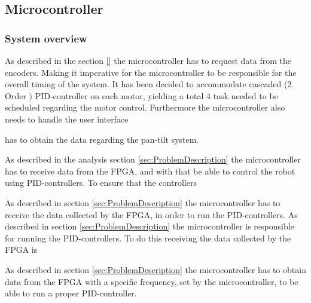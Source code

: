 \documentclass[../../main.tex]{subfiles}
\begin{document}
    



\subsection{Microcontroller} \label{subsec:SystemImplementationMicroController}

\subsubsection*{System overview}
\label{subsec:SystemImplementationOperatingSystem}

As described in the section \ref{} the microcontroller has to request data from the encoders.  Making it imperative for the microcontroller to be responsible for the overall timing of the system. It has been decided to accommodate cascaded (2. Order ) PID-controller on each motor, yielding a total 4 task needed to be scheduled regarding the motor control. Furthermore the microcontroller also needs to handle the user interface 

has to obtain the data regarding the pan-tilt system. 


As described in the analysis section \ref{sec:ProblemDescription} the microcontroller has to receive data from the FPGA, and with that be able to control the robot using PID-controllers. To ensure that the controllers


As described in section \ref{sec:ProblemDescription} the microcontroller has to receive the data collected by the FPGA, in order to run the PID-controllers. 
As described in section \ref{sec:ProblemDescription} the microcontroller is responsible for running the PID-controllers. To do this receiving the data collected by the FPGA is 

As described in section \ref{sec:ProblemDescription} the microcontroller has to obtain data from the FPGA with a specific frequency, set by the microcontroller, to be able to run a proper PID-controller. 
\end{document}
